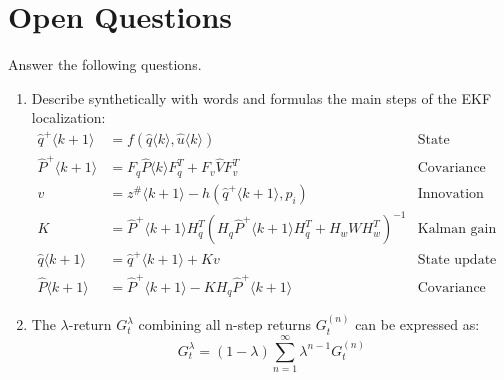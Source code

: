 \documentclass[openany]{book}
\theoremstyle{definition}
\theoremstyle{remark}
\begin{document}
\section*{Open Questions}
Answer the following questions.

\begin{enumerate}
    \item Describe synthetically with words and formulas the main steps of the EKF localization:
    \begin{align*}
        \hat{q}^+\langle k+1\rangle &= f(\hat{q}\langle k\rangle, \hat{u}\langle k\rangle) &\text{State prediction}\\
        \hat{P}^+\langle k+1\rangle &= F_q\hat{P}\langle k\rangle F_q^T + F_v\hat{V}F_v^T &\text{Covariance projection}\\
        v &= z^\#\langle k+1\rangle - h(\hat{q}^+\langle k+1\rangle, p_i) &\text{Innovation}\\
        K &= \hat{P}^+\langle k+1\rangle H_q^T(H_q\hat{P}^+\langle k+1\rangle H_q^T + H_wWH_w^T)^{-1} &\text{Kalman gain}\\
        \hat{q}\langle k+1\rangle &= \hat{q}^+\langle k+1\rangle + Kv &\text{State update with innovation}\\
        \hat{P}\langle k+1\rangle &= \hat{P}^+\langle k+1\rangle - KH_q\hat{P}^+\langle k+1\rangle &\text{Covariance update}
    \end{align*}

    \item The $\lambda$-return $G^\lambda_t$ combining all n-step returns $G^{(n)}_t$ can be expressed as:
    \[G^\lambda_t = (1-\lambda)\sum_{n=1}^\infty \lambda^{n-1}G^{(n)}_t\]
\end{enumerate}
\end{document}
